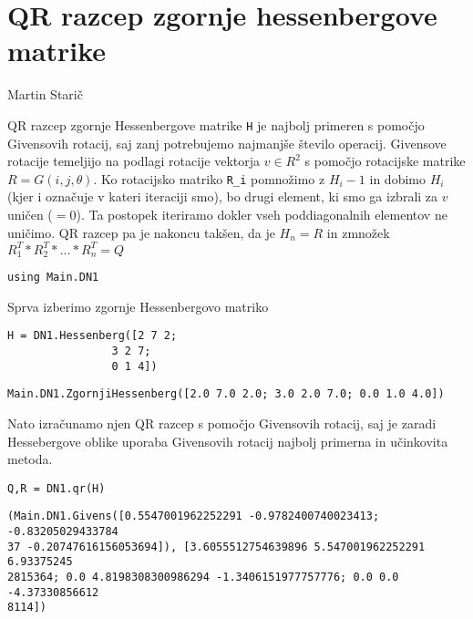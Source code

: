 \documentclass[12pt,a4paper]{article}
\begin{document}
\section{QR razcep zgornje hessenbergove matrike}
Martin Starič

QR razcep zgornje Hessenbergove matrike \texttt{H} je najbolj primeren s pomočjo Givensovih rotacij, saj zanj potrebujemo najmanjše število operacij. Givensove rotacije temeljijo na podlagi rotacije vektorja $v \in R^2$ s pomočjo rotacijske matrike $R = G(i,j,\theta)$. Ko rotacijsko matriko \texttt{R\_i} pomnožimo z $H_i-1$ in dobimo $H_i$ (kjer i označuje v kateri iteraciji smo), bo drugi element, ki smo ga izbrali za $v$ uničen ($= 0$). Ta postopek iteriramo dokler vseh poddiagonalnih elementov ne uničimo. QR razcep pa je nakoncu takšen, da je $H_n = R$ in zmnožek $R^T_1 * R^T_2 * ... * R^T_n = Q$


\begin{verbatim}
using Main.DN1
\end{verbatim}

Sprva izberimo zgornje Hessenbergovo matriko 


\begin{verbatim}
H = DN1.Hessenberg([2 7 2;
                3 2 7;
                0 1 4])
\end{verbatim}
\begin{verbatim}
Main.DN1.ZgornjiHessenberg([2.0 7.0 2.0; 3.0 2.0 7.0; 0.0 1.0 4.0])
\end{verbatim}

Nato izračunamo njen QR razcep s pomočjo Givensovih rotacij, saj je zaradi Hessebergove oblike uporaba Givensovih rotacij najbolj primerna in učinkovita metoda.


\begin{verbatim}
Q,R = DN1.qr(H)
\end{verbatim}
\begin{verbatim}
(Main.DN1.Givens([0.5547001962252291 -0.9782400740023413; -0.83205029433784
37 -0.20747616156053694]), [3.6055512754639896 5.547001962252291 6.93375245
2815364; 0.0 4.8198308300986294 -1.3406151977757776; 0.0 0.0 -4.37330856612
8114])
\end{verbatim}
\end{document}
